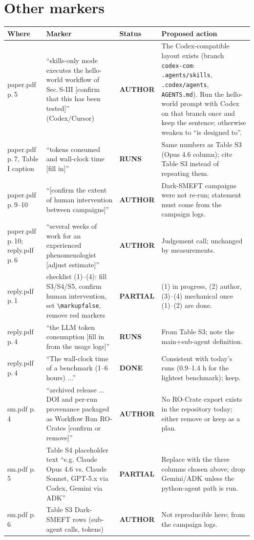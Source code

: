 \documentclass[11pt]{article}
\newcommand{\statusdone}{\textcolor{green!50!black}{\textbf{DONE}}}
\newcommand{\statuspartial}{\textcolor{orange!80!black}{\textbf{PARTIAL}}}
\newcommand{\statusneedrun}{\textcolor{blue!70!black}{\textbf{RUNS}}}
\newcommand{\statusauthor}{\textcolor{red!70!black}{\textbf{AUTHOR}}}
\begin{document}
\section{Other markers}
\begin{longtable}{p{3.2cm}p{5.6cm}p{1.6cm}p{6.2cm}}
\toprule
Where & Marker & Status & Proposed action \\
\midrule
\endhead
paper.pdf p.\,5 & ``skills-only mode executes the hello-world workflow of Sec.\,S-III [confirm that this has been tested]'' (Codex/Cursor) & \statusauthor & The Codex-compatible layout exists (branch \texttt{codex-com}: \texttt{.agents/skills}, \texttt{.codex/agents}, \texttt{AGENTS.md}). Run the hello-world prompt with Codex on that branch once and keep the sentence; otherwise weaken to ``is designed to''. \\
paper.pdf p.\,7, Table I caption & ``tokens consumed and wall-clock time [fill in]'' & \statusneedrun & Same numbers as Table S3 (Opus 4.6 column); cite Table S3 instead of repeating them. \\
paper.pdf p.\,9--10 & ``[confirm the extent of human intervention between campaigns]'' & \statusauthor & Dark-SMEFT campaigns were not re-run; statement must come from the campaign logs. \\
paper.pdf p.\,10; reply.pdf p.\,6 & ``several weeks of work for an experienced phenomenologist [adjust estimate]'' & \statusauthor & Judgement call; unchanged by measurements. \\
reply.pdf p.\,1 & checklist (1)--(4): fill S3/S4/S5, confirm human intervention, set \verb|\markupfalse|, remove red markers & \statuspartial & (1) in progress, (2) author, (3)--(4) mechanical once (1)--(2) are done. \\
reply.pdf p.\,4 & ``the LLM token consumption [fill in from the usage logs]'' & \statusneedrun & From Table S3; note the main+sub-agent definition. \\
reply.pdf p.\,4 & ``The wall-clock time of a benchmark (1--6 hours) ...'' & \statusdone & Consistent with today's runs (0.9--1.4 h for the lightest benchmark); keep. \\
sm.pdf p.\,4 & ``archived release ... DOI and per-run provenance packaged as Workflow Run RO-Crates [confirm or remove]'' & \statusauthor & No RO-Crate export exists in the repository today; either remove or keep as a plan. \\
sm.pdf p.\,5 & Table S4 placeholder text ``e.g. Claude Opus 4.6 vs. Claude Sonnet, GPT-5.x via Codex, Gemini via ADK'' & \statuspartial & Replace with the three columns chosen above; drop Gemini/ADK unless the python-agent path is run. \\
sm.pdf p.\,6 & Table S3 Dark-SMEFT rows (sub-agent calls, tokens) & \statusauthor & Not reproducible here; from the campaign logs. \\
\bottomrule
\end{longtable}
\end{document}
